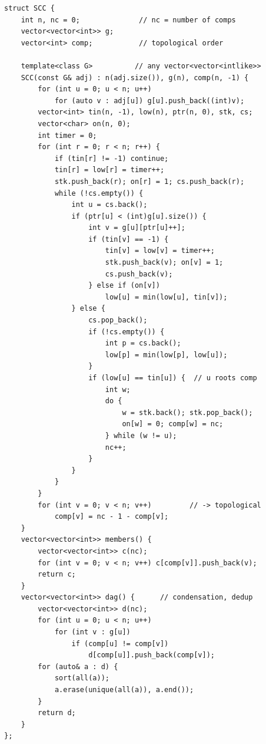\begin{lstlisting}
struct SCC {
    int n, nc = 0;              // nc = number of comps
    vector<vector<int>> g;
    vector<int> comp;           // topological order

    template<class G>          // any vector<vector<intlike>>
    SCC(const G& adj) : n(adj.size()), g(n), comp(n, -1) {
        for (int u = 0; u < n; u++)
            for (auto v : adj[u]) g[u].push_back((int)v);
        vector<int> tin(n, -1), low(n), ptr(n, 0), stk, cs;
        vector<char> on(n, 0);
        int timer = 0;
        for (int r = 0; r < n; r++) {
            if (tin[r] != -1) continue;
            tin[r] = low[r] = timer++;
            stk.push_back(r); on[r] = 1; cs.push_back(r);
            while (!cs.empty()) {
                int u = cs.back();
                if (ptr[u] < (int)g[u].size()) {
                    int v = g[u][ptr[u]++];
                    if (tin[v] == -1) {
                        tin[v] = low[v] = timer++;
                        stk.push_back(v); on[v] = 1;
                        cs.push_back(v);
                    } else if (on[v])
                        low[u] = min(low[u], tin[v]);
                } else {
                    cs.pop_back();
                    if (!cs.empty()) {
                        int p = cs.back();
                        low[p] = min(low[p], low[u]);
                    }
                    if (low[u] == tin[u]) {  // u roots comp
                        int w;
                        do {
                            w = stk.back(); stk.pop_back();
                            on[w] = 0; comp[w] = nc;
                        } while (w != u);
                        nc++;
                    }
                }
            }
        }
        for (int v = 0; v < n; v++)         // -> topological
            comp[v] = nc - 1 - comp[v];
    }
    vector<vector<int>> members() {
        vector<vector<int>> c(nc);
        for (int v = 0; v < n; v++) c[comp[v]].push_back(v);
        return c;
    }
    vector<vector<int>> dag() {      // condensation, dedup
        vector<vector<int>> d(nc);
        for (int u = 0; u < n; u++)
            for (int v : g[u])
                if (comp[u] != comp[v])
                    d[comp[u]].push_back(comp[v]);
        for (auto& a : d) {
            sort(all(a));
            a.erase(unique(all(a)), a.end());
        }
        return d;
    }
};
\end{lstlisting}

